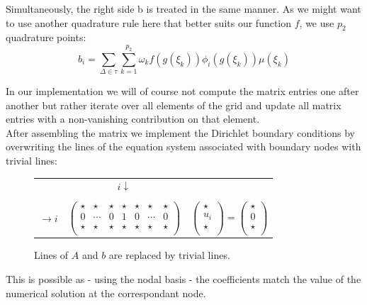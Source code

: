 \documentclass[11pt,a4paper,headinclude,footinclude,DIV16,normalheadings]{scrreprt}
\begin{document}
Simultaneously, the right side b is treated in the same manner. As we might want to use another quadrature rule here that better suits our function $f$, we use $p_2$ quadrature points:
\begin{equation}
\label{equ:computeb}
 b_i = \sum\limits_{\Delta\in\tau}\sum\limits_{k=1}^{p_2}\omega_k f(g(\xi_k ))\phi_i (g(\xi_k ))\mu(\xi_k )
\end{equation}

In our implementation we will of course not compute the matrix entries one after another but rather iterate over all elements of the grid and update all matrix entries with a non-vanishing contribution on that element. \\

After assembling the matrix we implement the Dirichlet boundary conditions by overwriting the lines of the equation system associated with boundary nodes with trivial lines:

\begin{figure}[h]
\begin{center}
\begin{tabular}{ccl}
& $\begin{array}{cccccccc}
& & &i\downarrow& & &\\
\end{array}$ & \\
$\rightarrow{i}$ &
$\left(\begin{array}{ccccccc}
\star&\star&\star&\star&\star&\star&\star\\
0&\cdots&0&1&0&\cdots&0\\
\star&\star&\star&\star&\star&\star&\star\\
\end{array}\right)$ &
$\left(\begin{array}{c}
\star \\
u_i \\
\star \\
\end{array}\right)
=
\left(\begin{array}{c}
\star \\
0 \\
\star \\
\end{array}\right)$
\end{tabular}
\end{center}
\caption{Lines of $A$ and $b$ are replaced by trivial lines.}
\label{Fig:dirichlet}
\end{figure}

This is possible as - using the nodal basis - the coefficients match the value of the numerical solution at the correspondant node.
\end{document}

